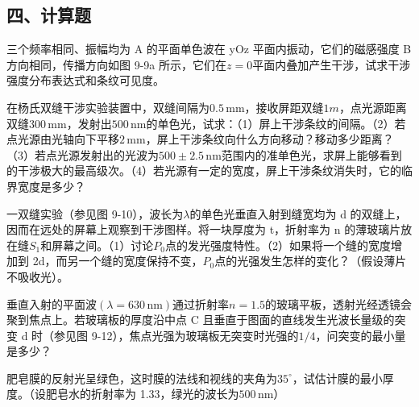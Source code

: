 \documentclass[padl, analysis, notocnum]{ExBook}
\newcommand{\answerarea}[1][3.5cm]{%
  \par\vspace{1mm}%
  \noindent{\color{themeColor!35}\rule{\linewidth}{0.4pt}}\par
  \noindent\begin{minipage}[t][#1][t]{\linewidth}\vspace{0pt}\end{minipage}\par
  \noindent{\color{themeColor!35}\rule{\linewidth}{0.4pt}}\par
}
\begin{document}
\subsection{四、计算题}
\begin{qitems}[startnum=1]
\qitem 三个频率相同、振幅均为 A 的平面单色波在 yOz 平面内振动，它们的磁感强度 B 方向相同，传播方向如图 9-9a 所示，它们在$z=0$平面内叠加产生干涉，试求干涉强度分布表达式和条纹可见度。
\label{q:248:start}
\answerarea[2.4cm]
\label{q:248:end}
\end{qitems}

\begin{qitems}[startnum=2]
\qitem 在杨氏双缝干涉实验装置中，双缝间隔为$0.5\,\mathrm{mm}$，接收屏距双缝$1m$，点光源距离双缝$300\,\mathrm{mm}$，发射出$500\,\mathrm{nm}$的单色光，试求：（1）屏上干涉条纹的间隔。（2）若点光源由光轴向下平移$2\,\mathrm{mm}$，屏上干涉条纹向什么方向移动？移动多少距离？（3）若点光源发射出的光波为$500\pm 2.5\,\mathrm{nm}$范围内的准单色光，求屏上能够看到的干涉极大的最高级次。（4）若光源有一定的宽度，屏上干涉条纹消失时，它的临界宽度是多少？
\label{q:249:start}
\answerarea[7.0cm]
\label{q:249:end}
\end{qitems}

\begin{qitems}[startnum=3]
\qitem 一双缝实验（参见图 9-10），波长为$\lambda$的单色光垂直入射到缝宽均为 d 的双缝上，因而在远处的屏幕上观察到干涉图样。将一块厚度为 t，折射率为 n 的薄玻璃片放在缝$S_{1}$和屏幕之间。（1）讨论$P_{0}$点的发光强度特性。（2）如果将一个缝的宽度增加到 2d，而另一个缝的宽度保持不变，$P_{0}$点的光强发生怎样的变化？（假设薄片不吸收光）。
\label{q:250:start}
\answerarea[7.0cm]
\label{q:250:end}
\end{qitems}

\begin{qitems}[startnum=4]
\qitem 垂直入射的平面波$(\lambda =630\,\mathrm{nm})$通过折射率$n=1.5$的玻璃平板，透射光经透镜会聚到焦点上。若玻璃板的厚度沿中点 C 且垂直于图面的直线发生光波长量级的突变 d 时（参见图 9-12），焦点光强为玻璃板无突变时光强的$1/4$，问突变的最小量是多少？
\label{q:251:start}
\answerarea[7.0cm]
\label{q:251:end}
\end{qitems}

\begin{qitems}[startnum=5]
\qitem 肥皂膜的反射光呈绿色，这时膜的法线和视线的夹角为$35^{\circ}$，试估计膜的最小厚度。（设肥皂水的折射率为 1.33，绿光的波长为$500\,\mathrm{nm}$）
\label{q:252:start}
\answerarea[7.0cm]
\label{q:252:end}
\end{qitems}
\end{document}
